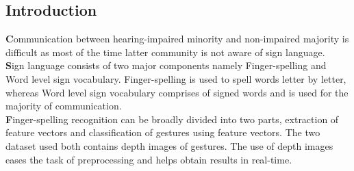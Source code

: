 \documentclass[a0,landscape]{a0poster}
\begin{document}
\vspace{1cm} %


\begin{multicols}{4} %


\color{Navy} %





\color{SaddleBrown} %

\section*{Introduction}

\textbf{C}ommunication between hearing-impaired minority and non-impaired majority is difficult as most of the time latter community is not aware of sign language.\\
\indent \textbf{S}ign language consists of two major components namely Finger-spelling and Word level sign vocabulary. Finger-spelling is used to spell words letter by letter, whereas Word level sign vocabulary comprises of signed words and is used for the majority of communication. \\
\indent \textbf{F}inger-spelling recognition can be broadly divided into two parts, extraction of feature vectors and classification of gestures using feature vectors. The two dataset used both contains depth images of gestures. The use of depth images eases the task of preprocessing and helps obtain results in real-time.


\end{multicols}
\end{document}

